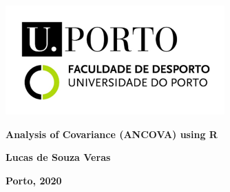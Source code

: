 \begin{center}
\includegraphics[width=\linewidth]{figs/UPorto.png}

\vspace{\fill}

\textbf{\Large Analysis of Covariance (ANCOVA) using R}

\vspace{\fill}

\textbf{Lucas de Souza Veras}

\medskip

\textbf{Porto, 2020}
\end{center}

\thispagestyle{empty}

\newpage
\tableofcontents
\newpage